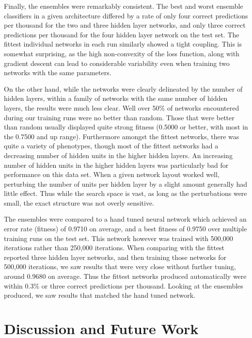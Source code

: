 \documentclass{article}
\DeclareMathOperator{\1}{\mathbbm{1}}
\begin{document}
Finally, the ensembles were remarkably consistent. The best and worst ensemble classifiers in a given architecture differed by
a rate of only four correct predictions per thousand for the two and three hidden layer networks, and only three correct
predictions per thousand for the four hidden layer network on the test set. The fittest individual networks in each run similarly
showed a tight coupling. This is somewhat surprising, as the high non-convexity of the loss function, along with 
gradient descent can lead to considerable variability even when training two networks with the same parameters. 

On the other hand, while the networks were clearly delineated by the number of hidden layers, within a family of networks
with the same number of hidden layers, the results were much less clear. Well over 50\% of networks encountered during our 
training runs were no better than random. Those that were better than random usually displayed quite strong fitness
(0.5000 or better, with most in the 0.7500 and up range). Furthermore amongst the fittest networks, there was quite a variety of phenotypes,
though most of the fittest networks had a decreasing number of hidden units in the higher hidden layers. An increasing number 
of hidden units in the higher hidden layers was particularly bad for performance on this data set. When a given network layout
worked well, perturbing the number of units per hidden layer by a slight amount generally had little effect. Thus while 
the search space is vast, as long as the perturbations were small, the exact structure was not overly sensitive.


The ensembles were compared to a hand tuned neural network which achieved an error rate (fitness) of 0.9710 on average, 
and a best fitness of 0.9750 over multiple training runs on the test set. This network however was trained with 500,000 iterations rather 
than 250,000 iterations. When comparing with the fittest reported three hidden layer networks, and then training those networks
for 500,000 iterations, we saw results that were very close without further tuning, around 0.9680 on average. Thus the fittest
networks produced automatically were within 0.3\% or three correct predictions per thousand. Looking at the ensembles produced,
we saw results that matched the hand tuned network. 


\section{Discussion and Future Work}
\end{document}
